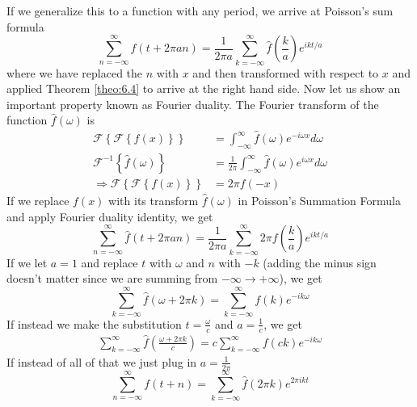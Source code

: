 \documentclass{report}
\theoremstyle{definition}
\theoremstyle{remark}
\newcommand{\ft}[1]{\mathscr{F}\left\{ #1\right\}}
\newcommand{\ift}[1]{\mathscr{F}^{-1} \left\{ #1 \right\}}
\begin{document}
If we generalize this to a function with any period, we arrive at Poisson's sum formula 
\begin{equation*}
    \sum^\infty_{n=-\infty} f(t+2\pi an)=\frac{1}{2\pi a}\sum^\infty_{k=-\infty} \hat{f}\left( \frac{k}{a} \right)e^{ikt/a}
\end{equation*}
where we have replaced the $n$ with $x$ and then transformed with respect to $x$ and applied Theorem \ref{theo:6.4} to arrive at the right hand side. Now let us show an important property known as Fourier duality. The Fourier transform of the function $\hat{f}(\omega)$ is 
\begin{equation*}
    \begin{split}
        \ft{\ft{f(x)}} &= \int^\infty_{-\infty}\hat{f}(\omega)e^{-i\omega x}d\omega \\
        \ift{\hat{f}(\omega)}&=\frac{1}{2\pi}\int^\infty_{-\infty}\hat{f}(\omega) e^{i\omega x}d\omega \\
        \Rightarrow \ft{\ft{f(x)}}&=2\pi f(-x)
    \end{split}
\end{equation*}
If we replace $f(x)$ with its transform $\hat{f}(\omega)$ in Poisson's Summation Formula and apply Fourier duality identity, we get 
\begin{equation*}
    \sum^\infty_{n=-\infty}\hat f(t+2\pi an) = \frac{1}{2\pi a}\sum^\infty_{k=-\infty}2\pi  f\left( \frac{k}{a}\right)e^{ikt/a}
\end{equation*}
If we let $a=1$ and replace $t$ with $\omega$ and $n$ with $-k$ (adding the minus sign doesn't matter since we are summing from $-\infty\rightarrow +\infty$), we get 
\begin{equation*}
    \sum^\infty_{k=-\infty}\hat f(\omega+2\pi k) = \sum^\infty_{k=-\infty}  f\left( k\right)e^{-ik\omega}
\end{equation*}
If instead we make the substitution $t=\frac{\omega}{c}$ and $a=\frac{1}{c}$, we get 
\begin{equation}
    \begin{split}
        \sum^\infty_{k=-\infty} \hat f\left( \frac{\omega+2\pi k}{c}\right) = c\sum^\infty_{k=-\infty} f(ck)e^{-ik\omega} \label{eq:7.1}
    \end{split}
\end{equation}
If instead of all of that we just plug in $a=\frac{1}{2\pi}$ 
\begin{equation*}
    \sum^\infty_{n=-\infty} f(t+n) = \sum^\infty_{k=-\infty}\hat f(2\pi k)e^{2\pi ikt}
\end{equation*}
\end{document}
